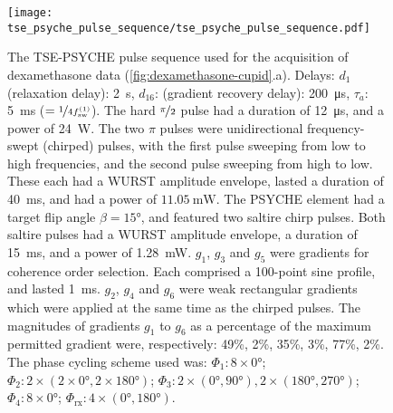 \begin{figure}[H]
    \centering
    \texttt{[image: tse\_psyche\_pulse\_sequence/tse\_psyche\_pulse\_sequence.pdf]}
    \caption[
        The \acs{TSE-PSYCHE} pulse sequence used for the acquisition of
        dexamethasone data.
    ]{
        The \acs{TSE-PSYCHE} pulse sequence used for the acquisition of
        dexamethasone
        data (\cref{fig:dexamethasone-cupid}.a).
        Delays:
        $d_1$ (relaxation delay): \qty{2}{\second},
        $d_{16}$: (gradient recovery delay): \qty{200}{\micro\second},
        $\tau_a$: \qty{5}{\milli\second} ($= \nicefrac{1}{4
        f_{\text{sw}}^{(1)}}$).
        The hard $\nicefrac{\pi}{2}$ pulse had a duration of
        \qty{12}{\micro\second}, and a power of \qty{24}{\watt}.
        The two $\pi$ pulses were unidirectional frequency-swept (chirped) pulses,
        with the first pulse sweeping from low to high frequencies, and the second
        pulse sweeping from high to low. These each had a \acs{WURST} amplitude
        envelope, lasted a duration of \qty{40}{\milli\second}, and had a power
        of $\qty{11.05}{\milli\watt}$.
        The \ac{PSYCHE} element had a target flip angle $\beta = \ang{15}$, and
        featured two saltire chirp pulses. Both saltire pulses had a
        \ac{WURST} amplitude envelope, a duration of \qty{15}{\milli\second},
        and a power of
        \qty{1.28}{\milli\watt}.
        $g_1$, $g_3$ and $g_5$ were gradients for coherence order selection.
        Each comprised a 100-point sine profile, and lasted
        \qty{1}{\milli\second}. $g_2$, $g_4$ and $g_6$ were weak rectangular gradients
        which were applied at the same time as the chirped pulses.
        The magnitudes of gradients $g_1$ to  $g_6$ as a percentage of the
        maximum permitted gradient were, respectively:
        49\%, 2\%, 35\%, 3\%, 77\%, 2\%.
        The phase cycling scheme used was:
        $\Phi_1: 8 \times \ang{0}$;
        $\Phi_2: 2 \times (2 \times \ang{0}, 2 \times \ang{180})$;
        $\Phi_3: 2 \times (\ang{0}, \ang{90}), 2 \times (\ang{180}, \ang{270})$;
        $\Phi_4: 8 \times \ang{0}$;
        $\Phi_{\text{rx}}: 4 \times (\ang{0}, \ang{180})$.
    }
    \label{fig:tse_psyche}


\end{figure}
